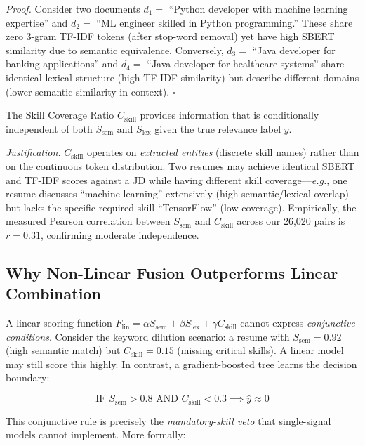 \documentclass{svproc}
\begin{document}
\textit{Proof.} Consider two documents $d_1 =$ ``Python developer with machine learning expertise'' and $d_2 =$ ``ML engineer skilled in Python programming.'' These share zero 3-gram TF-IDF tokens (after stop-word removal) yet have high SBERT similarity due to semantic equivalence. Conversely, $d_3 =$ ``Java developer for banking applications'' and $d_4 =$ ``Java developer for healthcare systems'' share identical lexical structure (high TF-IDF similarity) but describe different domains (lower semantic similarity in context). \hfill $\square$

\begin{proposition}\label{prop:skill}
The Skill Coverage Ratio $C_\text{skill}$ provides information that is conditionally independent of both $S_\text{sem}$ and $S_\text{lex}$ given the true relevance label $y$.
\end{proposition}

\textit{Justification.} $C_\text{skill}$ operates on \textit{extracted entities} (discrete skill names) rather than on the continuous token distribution. Two resumes may achieve identical SBERT and TF-IDF scores against a JD while having different skill coverage---\textit{e.g.}, one resume discusses ``machine learning'' extensively (high semantic/lexical overlap) but lacks the specific required skill ``TensorFlow'' (low coverage). Empirically, the measured Pearson correlation between $S_\text{sem}$ and $C_\text{skill}$ across our 26,020 pairs is $r = 0.31$, confirming moderate independence.

\subsection{Why Non-Linear Fusion Outperforms Linear Combination}

A linear scoring function $F_\text{lin} = \alpha S_\text{sem} + \beta S_\text{lex} + \gamma C_\text{skill}$ cannot express \textit{conjunctive conditions}. Consider the keyword dilution scenario: a resume with $S_\text{sem} = 0.92$ (high semantic match) but $C_\text{skill} = 0.15$ (missing critical skills). A linear model may still score this highly. In contrast, a gradient-boosted tree learns the decision boundary:

\begin{equation}
    \text{IF } S_\text{sem} > 0.8 \text{ AND } C_\text{skill} < 0.3 \implies \hat{y} \approx 0
\end{equation}

This conjunctive rule is precisely the \textit{mandatory-skill veto} that single-signal models cannot implement. More formally:
\end{document}
